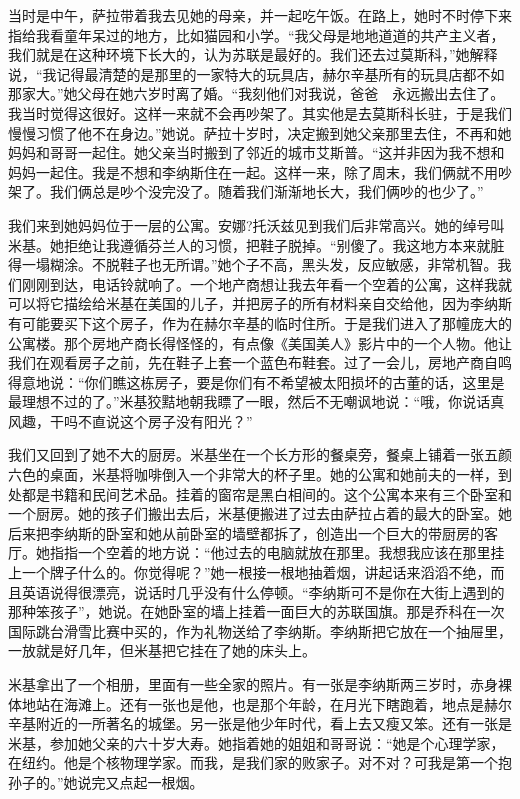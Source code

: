 当时是中午，萨拉带着我去见她的母亲，并一起吃午饭。在路上，她时不时停下来指给我看童年呆过的地方，比如猫园和小学。“我父母是地地道道的共产主义者，我们就是在这种环境下长大的，认为苏联是最好的。我们还去过莫斯科，”她解释说，“我记得最清楚的是那里的一家特大的玩具店，赫尔辛基所有的玩具店都不如那家大。”她父母在她六岁时离了婚。“我刻他们对我说，爸爸　永远搬出去住了。我当时觉得这很好。这样一来就不会再吵架了。其实他是去莫斯科长驻，于是我们慢慢习惯了他不在身边。”她说。萨拉十岁时，决定搬到她父亲那里去住，不再和她妈妈和哥哥一起住。她父亲当时搬到了邻近的城市艾斯普。“这并非因为我不想和妈妈一起住。我是不想和李纳斯住在一起。这样一来，除了周末，我们俩就不用吵架了。我们俩总是吵个没完没了。随着我们渐渐地长大，我们俩吵的也少了。”

我们来到她妈妈位于一层的公寓。安娜?托沃兹见到我们后非常高兴。她的绰号叫米基。她拒绝让我遵循芬兰人的习惯，把鞋子脱掉。“别傻了。我这地方本来就脏得一塌糊涂。不脱鞋子也无所谓。”她个子不高，黑头发，反应敏感，非常机智。我们刚刚到达，电话铃就响了。一个地产商想让我去年看一个空着的公寓，这样我就可以将它描绘给米基在美国的儿子，并把房子的所有材料亲自交给他，因为李纳斯有可能要买下这个房子，作为在赫尔辛基的临时住所。于是我们进入了那幢庞大的公寓楼。那个房地产商长得怪怪的，有点像《美国美人》影片中的一个人物。他让我们在观看房子之前，先在鞋子上套一个蓝色布鞋套。过了一会儿，房地产商自鸣得意地说：“你们瞧这栋房子，要是你们有不希望被太阳损坏的古董的话，这里是最理想不过的了。”米基狡黠地朝我瞟了一眼，然后不无嘲讽地说：“哦，你说话真风趣，干吗不直说这个房子没有阳光？”

我们又回到了她不大的厨房。米基坐在一个长方形的餐桌旁，餐桌上铺着一张五颜六色的桌面，米基将咖啡倒入一个非常大的杯子里。她的公寓和她前夫的一样，到处都是书籍和民间艺术品。挂着的窗帘是黑白相间的。这个公寓本来有三个卧室和一个厨房。她的孩子们搬出去后，米基便搬进了过去由萨拉占着的最大的卧室。她后来把李纳斯的卧室和她从前卧室的墙壁都拆了，创造出一个巨大的带厨房的客厅。她指指一个空着的地方说：“他过去的电脑就放在那里。我想我应该在那里挂上一个牌子什么的。你觉得呢？”她一根接一根地抽着烟，讲起话来滔滔不绝，而且英语说得很漂亮，说话时几乎没有什么停顿。“李纳斯可不是你在大街上遇到的那种笨孩子”，她说。在她卧室的墙上挂着一面巨大的苏联国旗。那是乔科在一次国际跳台滑雪比赛中买的，作为礼物送给了李纳斯。李纳斯把它放在一个抽屉里，一放就是好几年，但米基把它挂在了她的床头上。

米基拿出了一个相册，里面有一些全家的照片。有一张是李纳斯两三岁时，赤身裸体地站在海滩上。还有一张也是他，也是那个年龄，在月光下瞎跑着，地点是赫尔辛基附近的一所著名的城堡。另一张是他少年时代，看上去又瘦又笨。还有一张是米基，参加她父亲的六十岁大寿。她指着她的姐姐和哥哥说：“她是个心理学家，在纽约。他是个核物理学家。而我，是我们家的败家子。对不对？可我是第一个抱孙子的。”她说完又点起一根烟。

